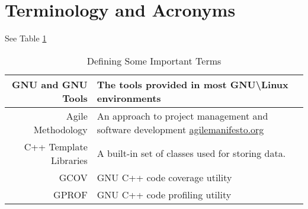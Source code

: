 \section{Terminology and Acronyms}
See Table \ref{terms}
\begin{table}[tbh]
\begin{center}
\begin{tabular}{|r|l|}
\hline
    GNU and GNU Tools & The tools provided in most GNU\textbackslash Linux environments \\ \hline
    Agile Methodology & An approach to project management and software development \url{agilemanifesto.org} \\ \hline
    C++ Template Libraries & A built-in set of classes used for storing data. \\ \hline
    GCOV & GNU C++ code coverage utility \\ \hline
    GPROF & GNU C++ code profiling utility \\
    \hline
\end{tabular}
\caption{Defining Some Important Terms \label{terms}}
\end{center}
\end{table}
